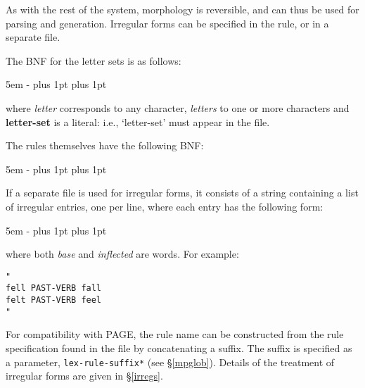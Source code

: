 \documentclass[12pt]{report}
\begin{document}
As with the rest of the system, morphology is reversible, and can
thus be used for parsing and generation.
Irregular forms can be specified in the rule, or in a separate
file.  

The BNF for the letter sets is as follows:
\begin{list}{}
   {\leftmargin 5em
    \itemindent -\leftmargin
    \itemsep 0pt plus 1pt
    \parsep 0pt plus 1pt}
\end{list}
where {\it letter} corresponds to any character, {\it letters} to one or
more characters and {\bf letter-set} is a literal: i.e., `letter-set' must appear
in the file.

The rules themselves have the following BNF:
\begin{list}{}
   {\leftmargin 5em
    \itemindent -\leftmargin
    \itemsep 0pt plus 1pt
    \parsep 0pt plus 1pt}
\end{list}

If a separate file is used for irregular forms, it consists of
a string containing a list of irregular entries, one per line,
where each entry has the following form:
\begin{list}{}
   {\leftmargin 5em
    \itemindent -\leftmargin
    \itemsep 0pt plus 1pt
    \parsep 0pt plus 1pt}
\end{list}
where both {\it base} and {\it inflected} are words.
For example:
\begin{verbatim}
"
fell PAST-VERB fall
felt PAST-VERB feel
"
\end{verbatim}
For compatibility with PAGE, the rule name can be constructed
from the rule specification found in the file by concatenating a 
suffix.  The suffix is specified as a parameter,
{\tt *lex-rule-suffix*} (see \S\ref{mpglob}).
Details of the treatment of irregular forms are given in
\S\ref{irregs}.
\end{document}
